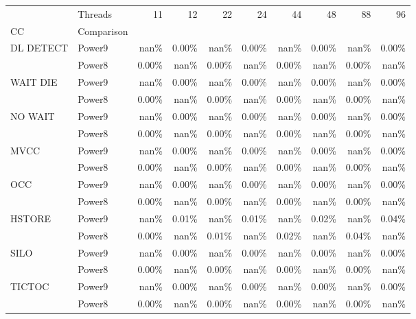 \begin{tabular}{llrrrrrrrr}
\toprule
       & Threads &    11 &    12 &    22 &    24 &    44 &    48 &    88 &    96 \\
CC & Comparison &       &       &       &       &       &       &       &       \\
\midrule
DL DETECT & Power9 &  nan\% & 0.00\% &  nan\% & 0.00\% &  nan\% & 0.00\% &  nan\% & 0.00\% \\
       & Power8 & 0.00\% &  nan\% & 0.00\% &  nan\% & 0.00\% &  nan\% & 0.00\% &  nan\% \\
WAIT DIE & Power9 &  nan\% & 0.00\% &  nan\% & 0.00\% &  nan\% & 0.00\% &  nan\% & 0.00\% \\
       & Power8 & 0.00\% &  nan\% & 0.00\% &  nan\% & 0.00\% &  nan\% & 0.00\% &  nan\% \\
NO WAIT & Power9 &  nan\% & 0.00\% &  nan\% & 0.00\% &  nan\% & 0.00\% &  nan\% & 0.00\% \\
       & Power8 & 0.00\% &  nan\% & 0.00\% &  nan\% & 0.00\% &  nan\% & 0.00\% &  nan\% \\
MVCC & Power9 &  nan\% & 0.00\% &  nan\% & 0.00\% &  nan\% & 0.00\% &  nan\% & 0.00\% \\
       & Power8 & 0.00\% &  nan\% & 0.00\% &  nan\% & 0.00\% &  nan\% & 0.00\% &  nan\% \\
OCC & Power9 &  nan\% & 0.00\% &  nan\% & 0.00\% &  nan\% & 0.00\% &  nan\% & 0.00\% \\
       & Power8 & 0.00\% &  nan\% & 0.00\% &  nan\% & 0.00\% &  nan\% & 0.00\% &  nan\% \\
HSTORE & Power9 &  nan\% & 0.01\% &  nan\% & 0.01\% &  nan\% & 0.02\% &  nan\% & 0.04\% \\
       & Power8 & 0.00\% &  nan\% & 0.01\% &  nan\% & 0.02\% &  nan\% & 0.04\% &  nan\% \\
SILO & Power9 &  nan\% & 0.00\% &  nan\% & 0.00\% &  nan\% & 0.00\% &  nan\% & 0.00\% \\
       & Power8 & 0.00\% &  nan\% & 0.00\% &  nan\% & 0.00\% &  nan\% & 0.00\% &  nan\% \\
TICTOC & Power9 &  nan\% & 0.00\% &  nan\% & 0.00\% &  nan\% & 0.00\% &  nan\% & 0.00\% \\
       & Power8 & 0.00\% &  nan\% & 0.00\% &  nan\% & 0.00\% &  nan\% & 0.00\% &  nan\% \\
\bottomrule
\end{tabular}

